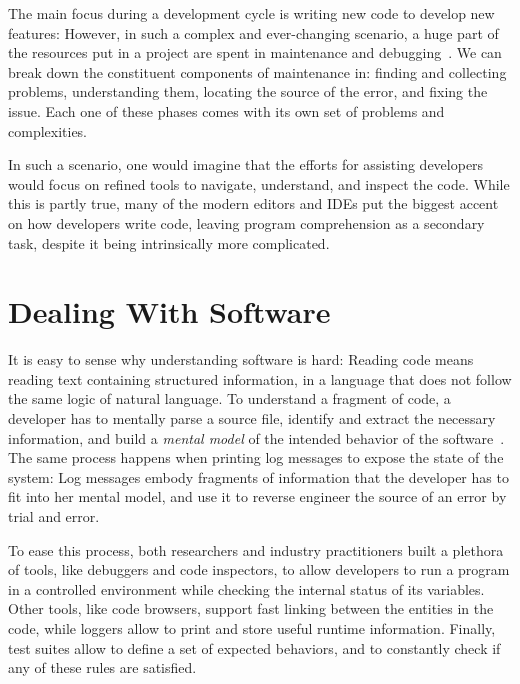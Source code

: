 The main focus during a development cycle is writing new code to develop new features: However, in such a complex and ever-changing scenario, a huge part of the resources put in a project are spent in maintenance and debugging~\cite{Corb1989,Fjel1983,Zelk1979,Mine2015b}.
We can break down the constituent components of maintenance in: finding and collecting problems, understanding them, locating the source of the error, and fixing the issue.
Each one of these phases comes with its own set of problems and complexities.

In such a scenario, one would imagine that the efforts for assisting developers would focus on refined tools to navigate, understand, and inspect the code.
While this is partly true, many of the modern editors and IDEs put the biggest accent on how developers write code, leaving program comprehension as a secondary task, despite it being intrinsically more complicated.


\section{Dealing With Software}

It is easy to sense why understanding software is hard: Reading code means reading text containing structured information, in a language that does not follow the same logic of natural language.
To understand a fragment of code, a developer has to mentally parse a source file, identify and extract the necessary information, and build a \emph{mental model} of the intended behavior of the software~\cite{vonm1995a}.
The same process happens when printing log messages to expose the state of the system: Log messages embody fragments of information that the developer has to fit into her mental model, and use it to reverse engineer the source of an error by trial and error.

To ease this process, both researchers and industry practitioners built a plethora of tools, like debuggers and code inspectors, to allow developers to run a program in a controlled environment while checking the internal status of its variables.
Other tools, like code browsers, support fast linking between the entities in the code, while loggers allow to print and store useful runtime information.
Finally, test suites allow to define a set of expected behaviors, and to constantly check if any of these rules are satisfied.

